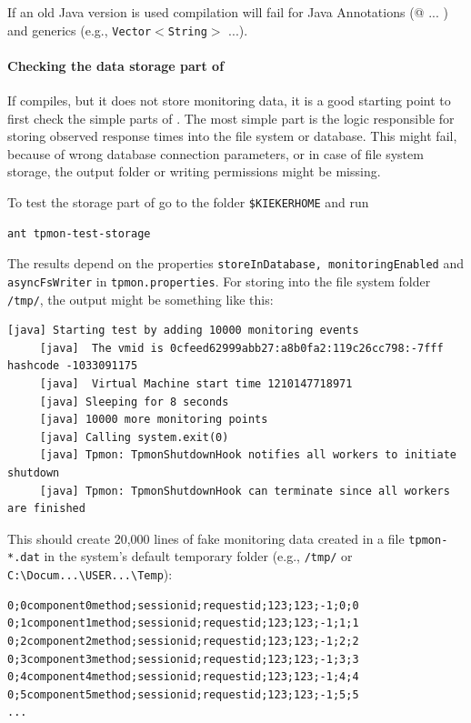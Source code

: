 \documentclass[a4paper,12pt]{scrartcl}
\begin{document}
If an old Java version is used compilation will fail for Java Annotations (@ ... ) and generics (e.g., \texttt{Vector$<$String$>$} ...).


\paragraph{Checking the data storage part of \tpmon{}}
If \tpmon{} compiles, but it does not store monitoring data, it is a good starting point to first check the simple parts of \tpmon{}. The most simple part is the logic responsible for storing observed response times into the file system or database. This might fail, because of wrong database connection parameters, or in case of file system storage, the output folder or writing permissions might be missing.

To test the storage part of \tpmon{} go to the folder \texttt{\$KIEKERHOME} and run
\begin{lstlisting}[caption={Testing the storage functionality},label={lst3}]
ant tpmon-test-storage
\end{lstlisting}

The results depend on the properties \texttt{storeInDatabase, monitoringEnabled} and \texttt{asyncFsWriter} in \texttt{tpmon.properties}. For storing into the file system folder \texttt{/tmp/}, the output might be something like this:

\begin{lstlisting}[caption={Output example for storage test},label={lst4}]
 [java] Starting test by adding 10000 monitoring events
     [java]  The vmid is 0cfeed62999abb27:a8b0fa2:119c26cc798:-7fff hashcode -1033091175
     [java]  Virtual Machine start time 1210147718971
     [java] Sleeping for 8 seconds
     [java] 10000 more monitoring points
     [java] Calling system.exit(0)
     [java] Tpmon: TpmonShutdownHook notifies all workers to initiate shutdown
     [java] Tpmon: TpmonShutdownHook can terminate since all workers are finished
\end{lstlisting}

This should create 20,000 lines of fake monitoring data created in a file \texttt{tpmon-*.dat} in the system's default temporary folder (e.g., \texttt{/tmp/} or \verb=C:\Docum...\USER...\Temp=):
\begin{lstlisting}[caption={Example fake monitoring data produced by the storage test},label={lst5}]
0;0component0method;sessionid;requestid;123;123;-1;0;0
0;1component1method;sessionid;requestid;123;123;-1;1;1
0;2component2method;sessionid;requestid;123;123;-1;2;2
0;3component3method;sessionid;requestid;123;123;-1;3;3
0;4component4method;sessionid;requestid;123;123;-1;4;4
0;5component5method;sessionid;requestid;123;123;-1;5;5
...
\end{lstlisting}
\end{document}
